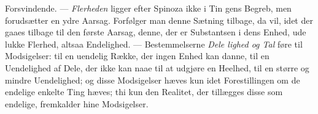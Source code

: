 \documentclass[12pt,a4paper]{book}
\begin{document}
Forsvindende. --- \emph{Flerheden} ligger efter Spinoza ikke i Tin\-%
gens Begreb, men forudsætter en ydre Aarsag. Forfølger man
denne Sætning tilbage, da vil, idet der gaaes tilbage til den
første Aarsag, denne, der er Substantsen i dens Enhed, ude\-%
lukke Flerhed, altsaa Endelighed. --- Bestemmelserne \emph{Dele\-%
lighed og Tal} føre til Modsigelser: til en uendelig Række,
der ingen Enhed kan danne, til en Uendelighed af Dele, der
ikke kan naae til at udgjøre en Heelhed, til en større og
mindre Uendelighed; og disse Modsigelser hæves kun idet
Forestillingen om de endelige enkelte Ting hæves; thi kun
den Realitet, der tillægges disse som endelige, fremkalder hine
Modsigelser.
\end{document}
